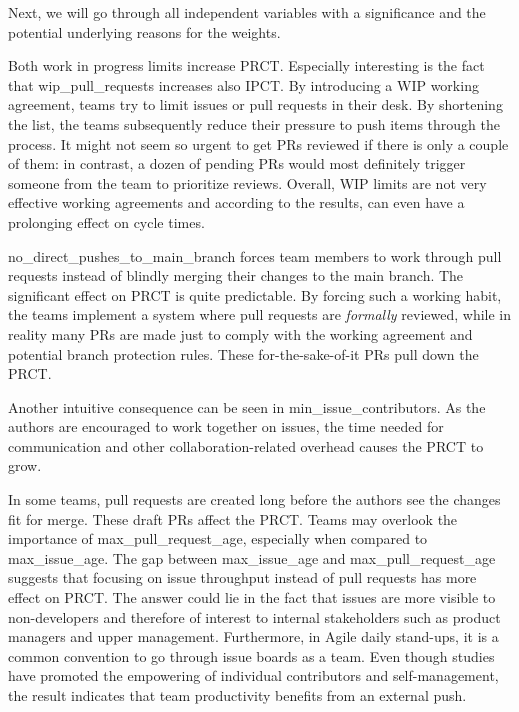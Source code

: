 
Next, we will go through all independent variables with a significance and the potential underlying reasons for the weights. 

Both work in progress limits increase PRCT. Especially interesting is the fact that wip\_pull\_requests increases also IPCT. By introducing a WIP working agreement, teams try to limit issues or pull requests in their desk. By shortening the list, the teams subsequently reduce their pressure to push items through the process. It might not seem so urgent to get PRs reviewed if there is only a couple of them: in contrast, a dozen of pending PRs would most definitely trigger someone from the team to prioritize reviews. Overall, WIP limits are not very effective working agreements and according to the results, can even have a prolonging effect on cycle times. 

no\_direct\_pushes\_to\_main\_branch forces team members to work through pull requests instead of blindly merging their changes to the main branch. The significant effect on PRCT is quite predictable. By forcing such a working habit, the teams implement a system where pull requests are \textit{formally} reviewed, while in reality many PRs are made just to comply with the working agreement and potential branch protection rules. These for-the-sake-of-it PRs pull down the PRCT.

Another intuitive consequence can be seen in min\_issue\_contributors. As the authors are encouraged to work together on issues, the time needed for communication and other collaboration-related overhead causes the PRCT to grow.

In some teams, pull requests are created long before the authors see the changes fit for merge. These draft PRs affect the PRCT. Teams may overlook the importance of max\_pull\_request\_age, especially when compared to max\_issue\_age. The gap between max\_issue\_age and max\_pull\_request\_age suggests that focusing on issue throughput instead of pull requests has more effect on PRCT. The answer could lie in the fact that issues are more visible to non-developers and therefore of interest to internal stakeholders such as product managers and upper management. Furthermore, in Agile daily stand-ups, it is a common convention to go through issue boards as a team. Even though studies have promoted the empowering of individual contributors and self-management, the result indicates that team productivity benefits from an external push.

